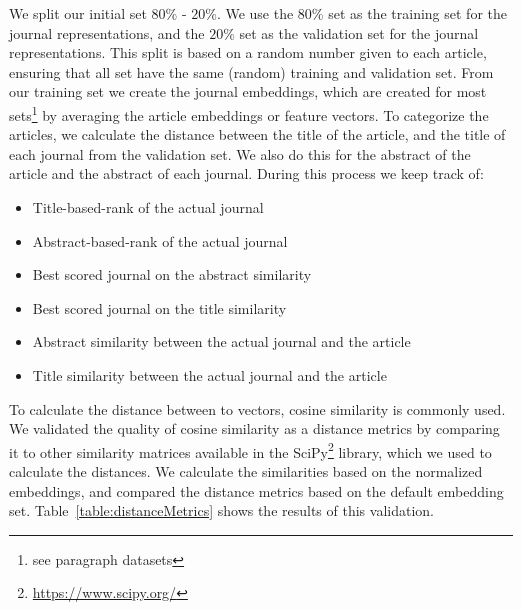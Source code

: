\documentclass[../../Thesis.tex]{subfiles}
\begin{document}
We split our initial set  $80\%$ - $20\%$. We use the $80\%$ set as the training set for the journal representations, and the $20\%$ set as the validation set for the journal representations. This split is based on a random number given to each article, ensuring that all set have the same (random) training and validation set.
From our training set we create the journal embeddings, which are created for most sets\footnote{see paragraph datasets} by averaging the article embeddings or feature vectors.
To categorize the articles, we calculate the distance between the title of the article, and the title of each journal from the validation set. We also do this for the abstract of the article and the abstract of each journal. During this process we keep track of:
\begin{itemize}
\item{Title-based-rank of the actual journal}
\item{Abstract-based-rank of the actual journal}
\item{Best scored journal on the abstract similarity}
\item{Best scored journal on the title similarity}
\item{Abstract similarity between the actual journal and the article}
\item{Title similarity between the actual journal and the article}
\end{itemize}
To calculate the distance between to vectors, cosine similarity is commonly used. We validated the quality of cosine similarity as a distance metrics by comparing it to other similarity matrices available in the SciPy\footnote{\url{https://www.scipy.org/}} library, which we used to calculate the distances. We calculate the similarities based on the normalized embeddings, and compared the distance metrics based on the default embedding set. Table~\ref{table:distanceMetrics} shows the results of this validation.\\
\end{document}
